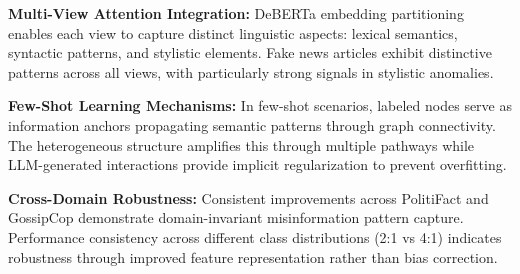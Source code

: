 \textbf{Multi-View Attention Integration:} DeBERTa embedding partitioning enables each view to capture distinct linguistic aspects: lexical semantics, syntactic patterns, and stylistic elements. Fake news articles exhibit distinctive patterns across all views, with particularly strong signals in stylistic anomalies.

\textbf{Few-Shot Learning Mechanisms:} In few-shot scenarios, labeled nodes serve as information anchors propagating semantic patterns through graph connectivity. The heterogeneous structure amplifies this through multiple pathways while LLM-generated interactions provide implicit regularization to prevent overfitting.

\textbf{Cross-Domain Robustness:} Consistent improvements across PolitiFact and GossipCop demonstrate domain-invariant misinformation pattern capture. Performance consistency across different class distributions (2:1 vs 4:1) indicates robustness through improved feature representation rather than bias correction.

\EndChapter
